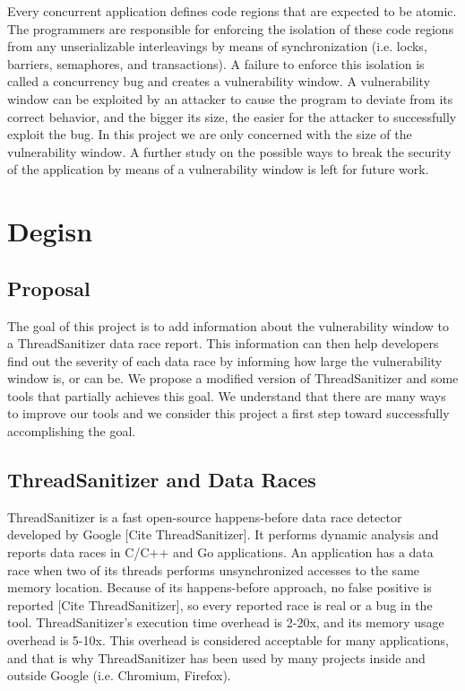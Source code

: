 \documentclass{acm_proc_article-sp}
\begin{document}
Every concurrent application defines code regions that are expected to be atomic. The programmers are responsible for enforcing the isolation of these code regions from any unserializable interleavings by means of synchronization (i.e. locks, barriers, semaphores, and transactions). A failure to enforce this isolation is called a concurrency bug and creates a vulnerability window. A vulnerability window can be exploited by an attacker to cause the program to deviate from its correct behavior, and the bigger its size, the easier for the attacker to successfully exploit the bug. In this project we are only concerned with the size of the vulnerability window. A further study on the possible ways to break the security of the application by means of a vulnerability window is left for future work.

\section{Degisn}
\subsection{Proposal}
The goal of this project is to add information about the vulnerability window to a ThreadSanitizer data race report. This information can then help developers find out the severity of each data race by informing how large the vulnerability window is, or can be. We propose a modified version of ThreadSanitizer and some tools that partially achieves this goal. We understand that there are many ways to improve our tools and we consider this project a first step toward successfully accomplishing the goal.

\subsection{ThreadSanitizer and Data Races}
ThreadSanitizer is a fast open-source happens-before data race detector developed by Google [Cite ThreadSanitizer]. It performs dynamic analysis and reports data races in C/C++ and Go applications. An application has a data race when two of its threads performs unsynchronized accesses to the same memory location. Because of its happens-before approach, no false positive is reported [Cite ThreadSanitizer], so every reported race is real or a bug in the tool. ThreadSanitizer’s execution time overhead is 2-20x, and its memory usage overhead is 5-10x. This overhead is considered acceptable for many applications, and that is why ThreadSanitizer has been used by many projects inside and outside Google (i.e. Chromium, Firefox).
\end{document}
